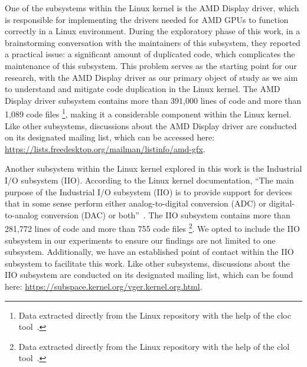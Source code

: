 One of the subsystems within the Linux kernel is the AMD Display driver, which
is responsible for implementing the drivers needed for AMD GPUs to function
correctly in a Linux environment.
%
During the exploratory phase of this work, in a brainstorming conversation with the maintainers of this subsystem, they reported a practical issue: a significant amount of duplicated code, which complicates the maintenance of this subsystem.
%
This problem serves as the
starting point for our research, with the AMD Display driver as our primary
object of study as we aim to understand and mitigate code duplication in the
Linux kernel. The AMD Display driver subsystem contains more than 391,000 lines 
of code and more than 1,089 code files
\footnote{ 
Data extracted directly from the Linux repository with the help of the cloc tool~\citep{cloc}.
}, 
making it a considerable component within the Linux kernel. Like other 
subsystems, discussions about the AMD Display driver are conducted on its 
designated mailing list, which can be accessed here: 
\url{https://lists.freedesktop.org/mailman/listinfo/amd-gfx}.

Another subsystem within the Linux kernel explored in this work is the
Industrial I/O subsystem (IIO). According to the Linux kernel documentation, 
``The main purpose of the Industrial I/O subsystem (IIO) is to provide support 
for devices that in some sense perform either analog-to-digital conversion (ADC) 
or digital-to-analog conversion (DAC) or both''~\citep{iiodoc}. The IIO subsystem 
contains more than 281,772 lines of code and more than 755 code files
\footnote{
Data extracted directly from the Linux repository with the help of the clol tool~\citep{cloc}.
}.
We opted to include the IIO subsystem in our experiments to ensure our findings 
are not limited to one subsystem. Additionally, we have an established point of
contact within the IIO subsystem to facilitate this work.
Like other subsystems, discussions about the IIO subsystem are conducted on its 
designated mailing list, which can be found here: 
\url{https://subspace.kernel.org/vger.kernel.org.html}.

